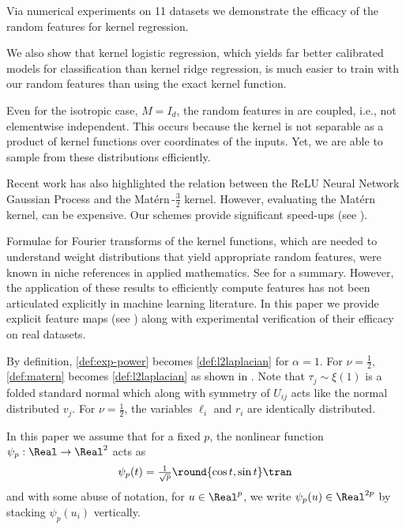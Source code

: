 \documentclass{article}
\def\matern{Mat\'ern\,}
\def\cite{\citep}
\theoremstyle{plain}
\begin{document}
Via numerical experiments on 11 datasets we demonstrate the efficacy of the random features for kernel regression. 

We also show that kernel logistic regression, which yields far better calibrated models for classification than kernel ridge regression, is much easier to train with our random features than using the exact kernel function. 

Even for the isotropic case, $M=I_d$, the random features in  are coupled, i.e., not elementwise independent. This occurs because the kernel is not separable as a product of kernel functions over coordinates of the inputs. Yet, we are able to sample from these distributions efficiently.


Recent work \cite{muyskens2024correspondence} has also highlighted the relation between the ReLU Neural Network Gaussian Process and the \matern-$\frac32$ kernel. However, evaluating the \matern kernel, can be expensive. Our schemes provide significant speed-ups (see ). 

Formulae for Fourier transforms of the kernel functions, which are needed to understand weight distributions that yield appropriate random features, were known in niche references in applied mathematics. See  for a summary. However, the application of these results to efficiently compute features has not been articulated explicitly in machine learning literature. In this paper we provide explicit feature maps (see ) along with experimental verification of their efficacy on real datasets.

\begin{remark} 
By definition, \eqref{def:exp-power} becomes \eqref{def:l2laplacian} for $\alpha=1$. For $\nu=\frac12$, \eqref{def:matern} becomes \eqref{def:l2laplacian} as shown in \cite[eqns. 10.1.19 and 10.2.15]{abramowitz1948handbook}.
Note that $\tau_j\sim\xi(1)$ is a folded standard normal which along with symmetry of $U_{ij}$ acts like the normal distributed $v_j$. For $\nu=\frac12$, the variables $\ell_i$ and $r_i$ are identically distributed.

\end{remark}

In this paper we assume that for a fixed $p$, the nonlinear function $\psi_p:\Real\to\Real^2$ acts as
\begin{align}
\label{eq:nonlinearity}    \psi_p(t)=\tfrac{1}{\sqrt p}\round{\cos t,\sin t}\tran
\end{align}
and with some abuse of notation, for $u\in\Real^p$, we write $\psi_p(u)\in\Real^{2p}$ by stacking $\psi_p(u_i)$ vertically.
\end{document}
